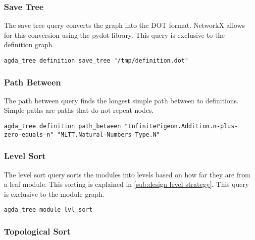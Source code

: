 \subsubsection{Save Tree}

The save tree query converts the graph into the DOT format. NetworkX allows for
this conversion using the pydot library. This query is exclusive to the
definition graph. 

\noindent
\begin{minipage}{\textwidth}
\begin{lstlisting}
agda_tree definition save_tree "/tmp/definition.dot"
\end{lstlisting}
\end{minipage}

\subsubsection{Path Between}

The path between query finds the longest simple path between to definitions.
Simple paths are paths that do not repeat nodes. 

\noindent
\begin{minipage}{\textwidth}
\begin{lstlisting}
agda_tree definition path_between "InfinitePigeon.Addition.n-plus-zero-equals-n" "MLTT.Natural-Numbers-Type.N"
\end{lstlisting}
\end{minipage}

\subsubsection{Level Sort}

The level sort query sorts the modules into levels based on how far they are
from a leaf module. This sorting is explained in \cref{sub:design level
strategy}. This query is exclusive to the module graph. 

\noindent
\begin{minipage}{\textwidth}
\begin{lstlisting}
agda_tree module lvl_sort
\end{lstlisting}
\end{minipage}

\subsubsection{Topological Sort}

